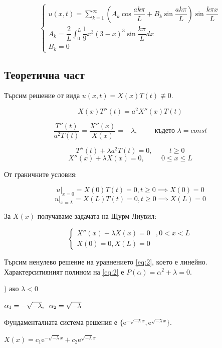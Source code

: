 \documentclass[14pt]{extarticle}
\let\frac\dfrac
\newcommand{\me}{\mathrm{e}}
\begin{document}
\[
\left\{
	\begin{array}{ll}
		\displaystyle u(x,t) = \sum_{k=1}^{\infty} \left( A_k\cos\frac{ak\pi}{L} + B_k\sin\frac{ak\pi}{L} \right) \sin\frac{k\pi x}{L} \\
		\displaystyle A_k = \frac{2}{L} \int_0^L \frac{1}{9}x^3(3-x)^3 \sin\frac{k\pi}{L} dx \\
		B_k = 0
	\end{array}
\right.
\]

\subsection{Теоретична част}

Търсим решение от вида $u(x,t) = X(x)T(t) \not\equiv 0$.

\[ X(x)T''(t) = a^2X''(x)T(t) \]

\[ \frac{T''(t)}{a^2T(t)} = \frac{X''(x)}{X(x)} = -\lambda , \hspace{1cm} \mbox{където } \lambda = const \]

\[ T''(t) + \lambda a^2T(t) = 0 , \hspace{1cm} t \geq 0 \]
\[ X''(x) + \lambda X(x) = 0 , \hspace{1cm} 0 \leq x \leq L \]

От граничните условия:

\[ u \big|_{x=0} = X(0)T(t) = 0 , t \geq 0 \implies X(0) = 0 \]
\[ u \big|_{x=L} = X(L)T(t) = 0 , t \geq 0 \implies X(L) = 0 \]

За $X(x)$ получаваме задачата на Щурм-Лиувил:

\begin{equation}
\left\{
	\begin{array}{ll}
		X''(x) + \lambda X(x) = 0 & , 0 < x < L \\ \tag{2}\label{eq:2}
		X(0) = 0, X(L) = 0
	\end{array}
\right.
\end{equation}

Търсим ненулево решение на уравнението \eqref{eq:2}, което е линейно. Характерситияният полином на \eqref{eq:2} е $P(\alpha) = \alpha^2 + \lambda = 0$.

) ако $\lambda < 0$

$ \alpha_1 = -\sqrt{-\lambda}, \hspace{2mm} \alpha_2 = \sqrt{-\lambda} $

Фундаменталната система решения е $\{\me^{-\sqrt{-\lambda}x}, \me^{\sqrt{-\lambda}x}\}$.

$X(x) = c_1\me^{-\sqrt{-\lambda}x} + c_2\me^{\sqrt{-\lambda}x}$
\end{document}
